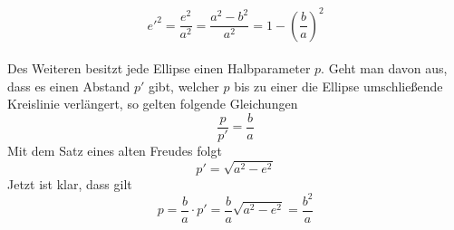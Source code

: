 \begin{equation}
e'^2=\frac{e^2}{a^2}=\frac{a^2-b^2}{a^2}=1-\left(\frac{b}{a}\right)^2 
\end{equation} 
\\Des Weiteren besitzt jede Ellipse einen Halbparameter \ensuremath{p}. Geht man davon aus, dass es einen Abstand \ensuremath{p'} gibt, welcher \ensuremath{p} bis zu einer die Ellipse umschließende Kreislinie verlängert, so gelten folgende Gleichungen
\begin{equation}
	\frac{p}{p'}=\frac{b}{a}
\end{equation}
Mit dem Satz eines alten Freudes folgt
\begin{equation}
p' = \sqrt{a^2-e^2}
\end{equation}
Jetzt ist klar, dass gilt
\begin{equation}
p=\frac{b}{a} \cdot p'= \frac{b}{a} \sqrt{a^2-e^2} = \frac{b^2}{a}
\label{equation_kepler_simple_p}
\end{equation}

